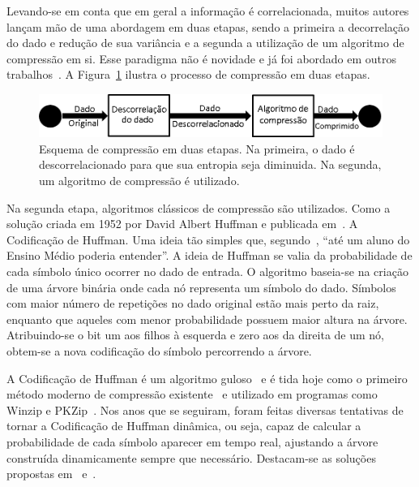 Levando-se em conta que em geral a informação é correlacionada, muitos autores
lançam mão de uma abordagem em duas etapas, sendo a primeira a decorrelação do
dado \label{Paragrafo:descorrelacaoprimeiraetapa} e redução de sua variância e a
segunda a utilização de um algoritmo de compressão em si. Esse paradigma não é
novidade e já foi abordado em outros
trabalhos~\citep{Article:twostagecompression}.
A Figura~\ref{Figura:compressaoduasetapas} ilustra o processo de compressão em
duas etapas. %

\begin{figure}[htb]
\centering
\includegraphics[scale=0.5]{fig/twostagecomp.png}
\caption[Compressão de duas etapas]{Esquema de compressão em duas etapas. Na
primeira, o dado é descorrelacionado para que sua entropia seja diminuida. Na
segunda, um algoritmo de compressão é utilizado.}
\label{Figura:compressaoduasetapas}
\end{figure}

Na segunda etapa, algoritmos clássicos de compressão são utilizados. Como a
solução criada em 1952 por David Albert Huffman e publicada 
em~\citep{Artigo:CodigoHuffman}. A Codificação de Huffman. Uma ideia tão simples
que, segundo~\citep{Book:HuffmanWinZip2}, \textquotedblleft até um aluno do
Ensino Médio poderia entender\textquotedblright. A ideia de Huffman se valia da
probabilidade de cada símbolo único ocorrer no dado de entrada. O algoritmo
baseia-se na criação de uma árvore binária onde cada nó representa um símbolo
do dado. Símbolos com maior número de repetições no dado original
estão mais perto da raiz, enquanto que aqueles com menor probabilidade possuem
maior altura na árvore. Atribuindo-se o bit um aos filhos à esquerda e zero aos
da direita de um nó, obtem-se a nova codificação do símbolo percorrendo a
árvore. 

A Codificação de Huffman é um algoritmo guloso~\citep{Livro:cormen} e é
tida hoje como o primeiro método moderno de compressão existente~\citep{Book:LosslessCompressionHandbook} e utilizado em
programas como Winzip e PKZip~\citep{Book:HuffmanWinZip, Book:HuffmanWinZip2}.
Nos anos que se seguiram, foram feitas diversas tentativas de tornar a
Codificação de Huffman dinâmica, ou seja, capaz de calcular a probabilidade de
cada símbolo aparecer em tempo real, ajustando a árvore construída
dinamicamente sempre que necessário. Destacam-se as soluções propostas
em~\citep{Artigo:KnuthDynamicHuffman} e~\citep{Artigo:VitterDynamicHuffman}.


